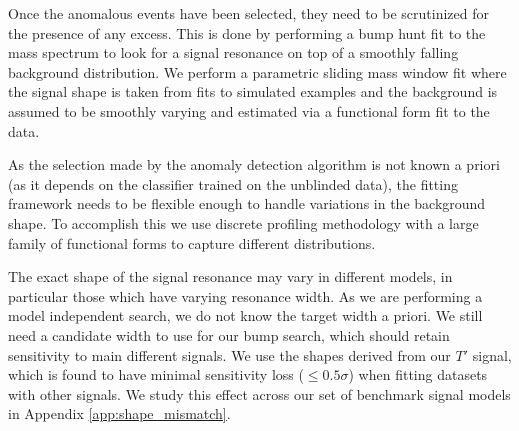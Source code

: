 \label{sec:stat_procedure}

\label{sec:mass_fitting}

Once the anomalous events have been selected, they need to be scrutinized for the presence of any excess.
This is done by performing a bump hunt fit to the mass spectrum to look for a signal resonance on top of a smoothly falling background distribution.
We perform a parametric sliding mass window fit where the signal shape is taken from fits to simulated examples and the background is assumed to be  smoothly varying and estimated via a functional form fit to the data.

As the selection made by the anomaly detection algorithm is not known a priori (as it depends on the classifier trained on the unblinded data), the fitting framework needs to be flexible enough to handle variations in the background shape.
To accomplish this we use discrete profiling methodology with a large family of functional forms to capture different distributions.

The exact shape of the signal resonance may vary in different models, in particular those which have varying resonance width.
As we are performing a model independent search, we do not know the target width a priori. 
We still need a candidate width to use for our bump search, which should retain sensitivity to main different signals. 
We use the shapes derived from our $T'$ signal, which is found to have minimal sensitivity loss ($\leq 0.5 \sigma$) when fitting datasets with other signals.
We study this effect across our set of benchmark signal models in Appendix \ref{app:shape_mismatch}.

